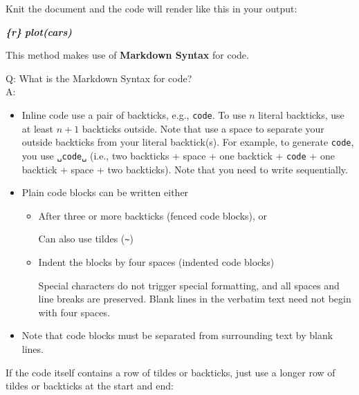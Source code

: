 \documentclass[
]{book}
\newenvironment{Shaded}{\begin{snugshade}}{\end{snugshade}}
\newcommand{\InformationTok}[1]{\textcolor[rgb]{0.56,0.35,0.01}{\textbf{\textit{#1}}}}
\begin{document}
Knit the document and the code will render like this in your output:

\begin{Shaded}
\begin{Highlighting}[]
\InformationTok{\textasciigrave{}\textasciigrave{}\textasciigrave{}\{r\}}
\InformationTok{plot(cars)}
\InformationTok{\textasciigrave{}\textasciigrave{}\textasciigrave{}}
\end{Highlighting}
\end{Shaded}

This method makes use of \textbf{Markdown Syntax} for code.

Q: What is the Markdown Syntax for code?\\
A:

\begin{itemize}
\item
  Inline code use a pair of backticks, e.g., \texttt{\textasciigrave{}code\textasciigrave{}}. To use \(n\) literal backticks, use at least \(n+1\) backticks outside. Note that use a space to separate your outside backticks from your literal backtick(s). For example, to generate \texttt{\textasciigrave{}code\textasciigrave{}}, you use \texttt{\textasciigrave{}\textasciigrave{}␣\textasciigrave{}code\textasciigrave{}␣\textasciigrave{}\textasciigrave{}} (i.e., two backticks + space + one backtick + \texttt{code} + one backtick + space + two backticks). Note that you need to write sequentially.
\item
  Plain code blocks can be written either

  \begin{itemize}
  \item
    After three or more backticks (fenced code blocks), or

    Can also use tildes (\texttt{\textasciitilde{}})
  \item
    Indent the blocks by four spaces (indented code blocks)

    Special characters do not trigger special formatting, and all spaces and line breaks are preserved. Blank lines in the verbatim text need not begin with four spaces.
  \end{itemize}
\item
  Note that code blocks must be separated from surrounding text by blank lines.
\end{itemize}

If the code itself contains a row of tildes or backticks, just use a longer row of tildes or backticks at the start and end:
\end{document}
